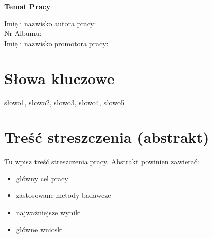 \begin{center}
   \textbf{\large Temat Pracy}
\end{center}
Imię i nazwisko autora pracy: \dotfill \\
Nr Albumu: \dotfill \\
Imię i nazwisko promotora pracy: \dotfill

\section*{Słowa kluczowe}
\noindent
słowo1, słowo2, słowo3, słowo4, słowo5

\section*{Treść streszczenia (abstrakt)}
\noindent
Tu wpisz treść streszczenia pracy. Abstrakt powinien zawierać:
\begin{itemize}
   \item główny cel pracy
   \item zastosowane metody badawcze
   \item najważniejsze wyniki
   \item główne wnioski
\end{itemize}
